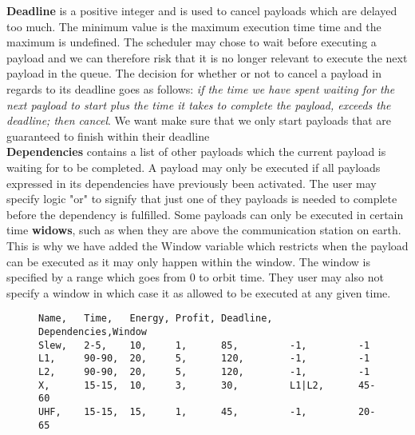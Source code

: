 \textbf{Deadline} is a positive integer and is used to cancel payloads which are delayed too much.
The minimum value is the maximum execution time time and the maximum is undefined.
The scheduler may chose to wait before executing a payload and we can therefore risk that it is no longer relevant to execute the next payload in the queue.
The decision for whether or not to cancel a payload in regards to its deadline goes as follows: \textit{if the time we have spent waiting for the next payload to start plus the time it takes to complete the payload, exceeds the deadline; then cancel}. We want make sure that we only start payloads that are guaranteed to finish within their deadline\\
\textbf{Dependencies} contains a list of other payloads which the current payload is waiting for to be completed. A payload may only be executed if all payloads expressed in its dependencies have previously been activated. The user may specify logic "or" to signify that just one of they payloads is needed to complete before the dependency is fulfilled.
Some payloads can only be executed in certain time \textbf{widows}, such as when they are above the communication station on earth.
This is why we have added the Window variable which restricts when the payload can be executed as it may only happen within the window. The window is specified by a range which goes from 0 to orbit time. They user may also not specify a window in which case it as allowed to be executed at any given time.
\begin{figure}[H]
\begin{lstlisting}[caption={An example of how five payloads can be defined}, label=lst:csv, language=text]
Name,	Time,	Energy,	Profit,	Deadline,	Dependencies,Window
Slew,	2-5,	10,		1,		85,			-1,			-1
L1,		90-90,	20,		5,		120,		-1,			-1
L2,		90-90,	20,		5,		120,		-1,			-1
X,		15-15,	10,		3,		30,			L1|L2,		45-60
UHF,	15-15,	15,		1,		45,			-1,			20-65
\end{lstlisting}
\end{figure}

